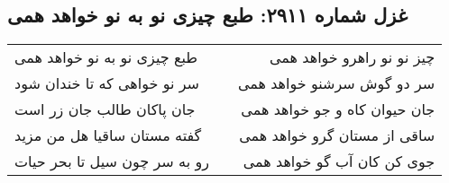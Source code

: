 \begin{center}
\section*{غزل شماره ۲۹۱۱: طبع چیزی نو به نو خواهد همی}
\label{sec:2911}
\begin{longtable}{l p{0.5cm} r}
طبع چیزی نو به نو خواهد همی
&&
چیز نو نو راهرو خواهد همی
\\
سر نو خواهی که تا خندان شود
&&
سر دو گوش سرشنو خواهد همی
\\
جان پاکان طالب جان زر است
&&
جان حیوان کاه و جو خواهد همی
\\
گفته مستان ساقیا هل من مزید
&&
ساقی از مستان گرو خواهد همی
\\
رو به سر چون سیل تا بحر حیات
&&
جوی کن کان آب گو خواهد همی
\\
\end{longtable}
\end{center}
